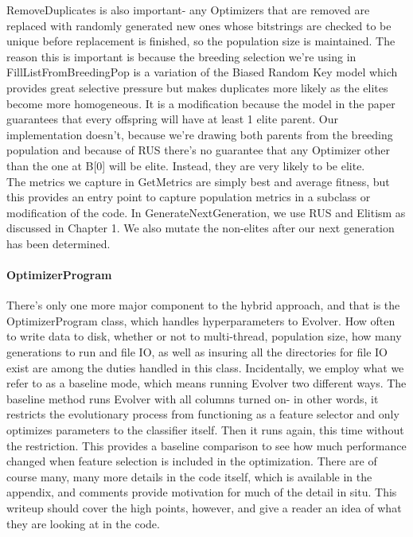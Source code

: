 RemoveDuplicates is also important- any Optimizers that are removed are replaced with randomly generated new ones whose bitstrings are checked to be unique before replacement is finished, so the population size is maintained.  The reason this is important is because the breeding selection we're using in FillListFromBreedingPop is a variation of the Biased Random Key model \citep{ruiz_biased_2015} which provides great selective pressure but makes duplicates more likely as the elites become more homogeneous.  It is a modification because the model in the paper guarantees that every offspring will have at least 1 elite parent.  Our implementation doesn't, because we're drawing both parents from the breeding population and because of RUS there's no guarantee that any Optimizer other than the one at B[0] will be elite.  Instead, they are very likely to be elite.\\
The metrics we capture in GetMetrics are simply best and average fitness, but this provides an entry point to capture population metrics in a subclass or modification of the code.  In GenerateNextGeneration, we use RUS and Elitism as discussed in Chapter 1.  We also mutate the non-elites after our next generation has been determined.
\paragraph{OptimizerProgram}
There's only one more major component to the hybrid approach, and that is the OptimizerProgram class, which handles hyperparameters to Evolver.  How often to write data to disk, whether or not to multi-thread, population size, how many generations to run and file IO, as well as insuring all the directories for file IO exist are among the duties handled in this class.  Incidentally, we employ what we refer to as a baseline mode, which means running Evolver two different ways.  The baseline method runs Evolver with all columns turned on- in other words, it restricts the evolutionary process from functioning as a feature selector and only optimizes parameters to the classifier itself.  Then it runs again, this time without the restriction.  This provides a baseline comparison to see how much performance changed when feature selection is included in the optimization.
There are of course many, many more details in the code itself, which is available in the appendix, and comments provide motivation for much of the detail in situ.  This writeup should cover the high points, however, and give a reader an idea of what they are looking at in the code.
